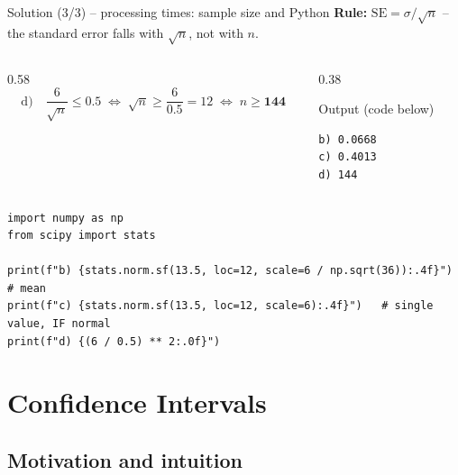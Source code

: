 \documentclass[aspectratio=169,11pt]{beamer}
\begin{document}
\begin{frame}[fragile]{Solution (3/3) -- processing times: sample size and Python}
  \textbf{Rule:} $\mathrm{SE}=\sigma/\sqrt n$ -- the standard error falls with
  $\sqrt n$, not with $n$.
  \begin{columns}[T]
    \begin{column}{0.58\textwidth}
      \[
        \text{d)}\quad \frac{6}{\sqrt n}\le 0.5
        \;\Leftrightarrow\; \sqrt n\ge\frac{6}{0.5}=12
        \;\Leftrightarrow\; n\ge \mathbf{144}
      \]
    \end{column}
    \begin{column}{0.38\textwidth}
      \begin{block}{Output (code below)}
\begin{lstlisting}[style=Pyout]
b) 0.0668
c) 0.4013
d) 144
\end{lstlisting}
      \end{block}
    \end{column}
  \end{columns}
\begin{lstlisting}
import numpy as np
from scipy import stats

print(f"b) {stats.norm.sf(13.5, loc=12, scale=6 / np.sqrt(36)):.4f}")  # mean
print(f"c) {stats.norm.sf(13.5, loc=12, scale=6):.4f}")   # single value, IF normal
print(f"d) {(6 / 0.5) ** 2:.0f}")
\end{lstlisting}
\end{frame}

\section[CIs]{Confidence Intervals}

\subsection{Motivation and intuition}
\end{document}
